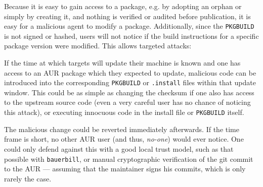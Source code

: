 Because it is easy to gain access to a package, e.g. by adopting an orphan or simply by creating it, and nothing is verified or audited before publication, it is easy for a malicious agent to modify a package.
Additionally, since the \texttt{PKGBUILD} is not signed or hashed, users will not notice if the build instructions for a specific package version were modified. This allows targeted attacks:

If the time at which targets will update their machine is known and one has access to an AUR package which they expected to update, malicious code can be introduced into the corresponding \texttt{PKGBUILD} or \texttt{.install} files within that update window.
This could be as simple as changing the checksum if one also has access to the upstream source code (even a very careful user has no chance of noticing this attack), or executing innocuous code in the install file or \texttt{PKGBUILD} itself.

The malicious change could be reverted immediately afterwards. If the time frame is short, no other AUR user (and thus, \emph{no-one}) would ever notice.
One could only defend against this with a good local trust model, such as that possible with \texttt{bauerbill}, or manual cryptographic verification of the git commit to the AUR --- assuming that the maintainer signs his commits, which is only rarely the case.
